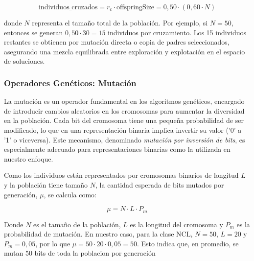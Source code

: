 \begin{equation}
\text{individuos\_cruzados} = r_c \cdot \text{offspringSize} = 0,50 \cdot \left(0,60 \cdot N\right)
\end{equation}

donde \( N \) representa el tamaño total de la población.  
Por ejemplo, si \( N = 50 \), entonces se generan \( 0{,}50 \cdot 30 = 15 \) individuos por cruzamiento.  
Los 15 individuos restantes se obtienen por mutación directa o copia de padres seleccionados, asegurando una mezcla equilibrada entre exploración y explotación en el espacio de soluciones.

\subsubsection{Operadores Genéticos: Mutación}

La mutación es un operador fundamental en los algoritmos genéticos, encargado de introducir cambios aleatorios en los cromosomas para aumentar la diversidad en la población.  
Cada bit del cromosoma tiene una pequeña probabilidad de ser modificado, lo que en una representación binaria implica invertir su valor ('0' a '1' o viceversa).  
Este mecanismo, denominado \emph{mutación por inversión de bits}, es especialmente adecuado para representaciones binarias como la utilizada en nuestro enfoque. 

Como los individuos están representados por cromosomas binarios de longitud $L$ y la población tiene tamaño $N$,  
la cantidad esperada de bits mutados por generación, $\mu$, se calcula como:

\[
\mu = N \cdot L \cdot P_m
\]

Donde $N$ es el tamaño de la población, $L$ es la longitud del cromosoma y $P_m$ es la probabilidad de mutación.
En nuestro caso, para la clase NCL, $N = 50$, $L = 20$ y $P_m = 0,05$, por lo que $\mu = 50 \cdot 20 \cdot 0,05 = 50$.
Esto indica que, en promedio, se mutan 50 bits de toda la poblacion por generación



